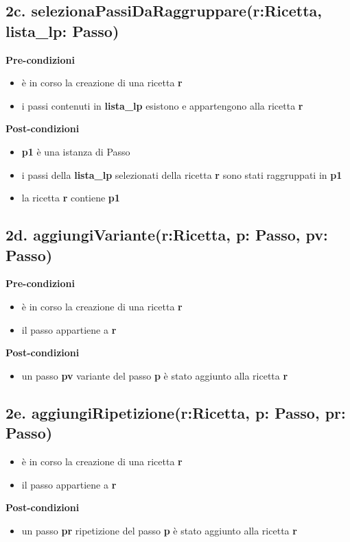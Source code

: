 \documentclass[12pt]{extarticle}
\begin{document}
\subsection*{2c. selezionaPassiDaRaggruppare(r:Ricetta, lista\_lp: Passo)}

\textbf{Pre-condizioni}
\begin{itemize}
  \item è in corso la creazione di una ricetta  \textbf{r}
  \item i passi contenuti in \textbf{lista\_lp} esistono e appartengono alla ricetta \textbf{r}
\end{itemize}
\textbf{Post-condizioni}
\begin{itemize}
  \item \textbf{p1} è una istanza di Passo
  \item i passi della \textbf{lista\_lp} selezionati della ricetta  \textbf{r} sono stati raggruppati in \textbf{p1}
  \item  la ricetta \textbf{r} contiene  \textbf{p1}
\end{itemize}

\subsection*{2d. aggiungiVariante(r:Ricetta, p: Passo, pv: Passo)}

\textbf{Pre-condizioni}
\begin{itemize}
  \item è in corso la creazione di una ricetta  \textbf{r}
  \item il passo  appartiene a \textbf{r}
\end{itemize}
\textbf{Post-condizioni}
\begin{itemize}
  \item un passo  \textbf{pv} variante del passo  \textbf{p} è stato aggiunto alla ricetta  \textbf{r}
\end{itemize}

\subsection*{2e. aggiungiRipetizione(r:Ricetta, p: Passo, pr: Passo)}
\begin{itemize}
  \item è in corso la creazione di una ricetta  \textbf{r}
  \item il passo  appartiene a \textbf{r}
\end{itemize}
\textbf{Post-condizioni}
\begin{itemize}
  \item un passo  \textbf{pr} ripetizione del passo  \textbf{p} è stato aggiunto alla ricetta  \textbf{r}
\end{itemize}
\end{document}
